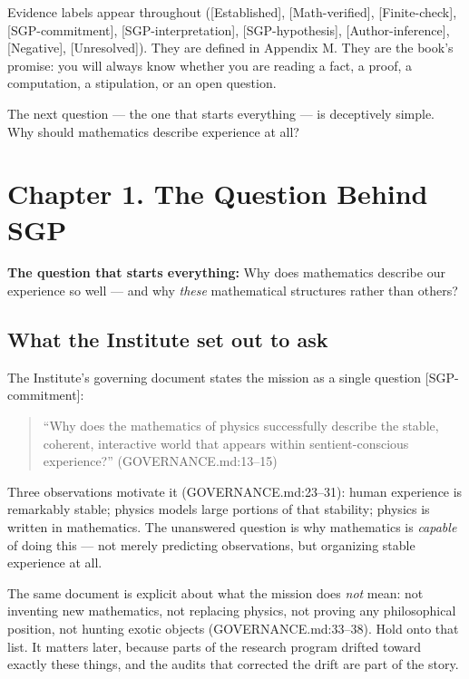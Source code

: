 \documentclass[
  11pt,
]{book}
\begin{document}
Evidence labels appear throughout ({[}Established{]},
{[}Math-verified{]}, {[}Finite-check{]}, {[}SGP-commitment{]},
{[}SGP-interpretation{]}, {[}SGP-hypothesis{]}, {[}Author-inference{]},
{[}Negative{]}, {[}Unresolved{]}). They are defined in Appendix M. They
are the book's promise: you will always know whether you are reading a
fact, a proof, a computation, a stipulation, or an open question.

The next question --- the one that starts everything --- is deceptively
simple. Why should mathematics describe experience at all?

\newpage

\chapter{Chapter 1. The Question Behind
SGP}\label{chapter-1.-the-question-behind-sgp}

\textbf{The question that starts everything:} Why does mathematics
describe our experience so well --- and why \emph{these} mathematical
structures rather than others?

\section{What the Institute set out to
ask}\label{what-the-institute-set-out-to-ask}

The Institute's governing document states the mission as a single
question {[}SGP-commitment{]}:

\begin{quote}
``Why does the mathematics of physics successfully describe the stable,
coherent, interactive world that appears within sentient-conscious
experience?'' (GOVERNANCE.md:13--15)
\end{quote}

Three observations motivate it (GOVERNANCE.md:23--31): human experience
is remarkably stable; physics models large portions of that stability;
physics is written in mathematics. The unanswered question is why
mathematics is \emph{capable} of doing this --- not merely predicting
observations, but organizing stable experience at all.

The same document is explicit about what the mission does \emph{not}
mean: not inventing new mathematics, not replacing physics, not proving
any philosophical position, not hunting exotic objects
(GOVERNANCE.md:33--38). Hold onto that list. It matters later, because
parts of the research program drifted toward exactly these things, and
the audits that corrected the drift are part of the story.
\end{document}
